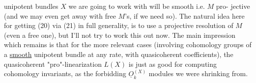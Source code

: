 
unipotent bundles $X$ we are going to work with will be smooth i.e. $M$ pro-%
jective (and we may even get away with free $M$'s, if we need so). The
natural idea here for getting (20) via (21) in full generality, is to
use a projective resolution of $M$ (even a free one), but I'll not try to
work this out now. The main impression which remains is that for the
more relevant cases (involving cohomology  groups of a \uline{smooth}
unipotent bundle at any rate, with quasicoherent coefficients), the
quasicoherent "pro"-linearization $L(X)$ is just as good for computing
cohomology invariants, as the forbidding $\underline{O}_k^{(X)}$ modules we were shrinking
from.

